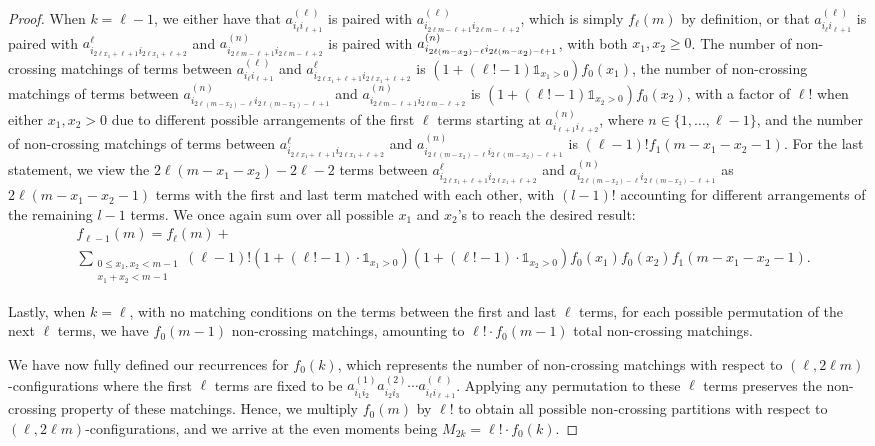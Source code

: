 \documentclass[11pt,reqno]{amsart}
\numberwithin{equation}{section}
\theoremstyle{plain}
\begin{document}
\begin{proof}
When $k=\ell-1$, we either have that $a^{(\ell)}_{i_{\ell}i_{\ell+1}}$ is paired with $a^{(\ell)}_{i_{2\ell m - \ell+1}i_{2\ell m - \ell+2}}$, which is simply $f_\ell(m)$ by definition, or that $a^{(\ell)}_{i_{\ell}i_{\ell+1}}$ is paired with $a^{\ell}_{i_{2\ell x_1 +\ell+1}i_{2\ell x_1+\ell+2}}$ and $a^{(n)}_{i_{2\ell m-\ell+1}i_{2\ell m-\ell+2}}$ is paired with $\\a^{(n)}_{i_{2\ell (m-x_2) - \ell}i_{2\ell(m- x_2) - \ell+1}}$, with both $x_1, x_2 \geq 0$. The number of non-crossing matchings of terms between $a^{(\ell)}_{i_{\ell}i_{\ell+1}}$ and $a^{\ell}_{i_{2\ell x_1 +\ell+1}i_{2\ell x_1+\ell+2}}$ is $(1+(\ell!-1)\mathbb{1}_{x_1>0})f_0(x_1)$, the number of non-crossing matchings of terms between $a^{(n)}_{i_{2\ell (m-x_2) - \ell}i_{2\ell(m- x_2) - \ell+1}}$ and $a^{(n)}_{i_{2\ell m-\ell+1}i_{2\ell m-\ell+2}}$ is  $(1+(\ell!-1)\mathbb{1}_{x_2>0})f_0(x_2)$, with a factor of $\ell!$ when either $x_1,x_2 > 0$ due to different possible arrangements of the first $\ell$ terms starting at $a^{(n)}_{i_{\ell+1}i_{\ell+2}}$, where $n \in \{1, \dotsc, \ell-1\}$, and the number of non-crossing matchings of terms between $a^{\ell}_{i_{2\ell x_1 +\ell+1}i_{2\ell x_1+\ell+2}}$ and $a^{(n)}_{i_{2\ell (m-x_2) - \ell}i_{2\ell(m- x_2) - \ell+1}}$ is $(\ell-1)!f_1(m-x_1-x_2-1)$. For the last statement, we view the $2\ell(m-x_1-x_2)-2\ell-2$ terms between $a^{\ell}_{i_{2\ell x_1 +\ell+1}i_{2\ell x_1+\ell+2}}$ and $a^{(n)}_{i_{2\ell (m-x_2) - \ell}i_{2\ell(m- x_2) - \ell+1}}$ as $2\ell(m-x_1-x_2-1)$ terms with the first and last term matched with each other, with $(l-1)!$ accounting for different arrangements of the remaining $l-1$ terms. We once again sum over all possible $x_1$ and $x_2$'s to reach the desired result:
\begin{align}
&f_{\ell-1}(m)=f_\ell(m)+\nonumber
\\
&\sum_{\substack{0\leq x_1,x_2<m-1\\ x_1+x_2<m-1}} (\ell-1)!(1+(\ell!-1)\cdot \mathbb{1}_{x_1>0})(1+(\ell!-1)\cdot \mathbb{1}_{x_2>0})f_0(x_1)f_0(x_2)f_1(m-x_1-x_2-1).
\end{align}

Lastly, when $k=\ell$, with no matching conditions on the terms between the first and last $\ell$ terms, for each possible permutation of the next $\ell$ terms, we have $f_0(m-1)$ non-crossing matchings, amounting to $\ell!\cdot f_0(m-1)$ total non-crossing matchings.

We have now fully defined our recurrences for $f_0(k)$, which represents the number of non-crossing matchings with respect to $(\ell, 2\ell m)$-configurations where the first $\ell$ terms are fixed to be $a^{(1)}_{i_1i_2}a^{(2)}_{i_2i_3}\cdots a^{(\ell)}_{i_\ell i_{\ell+1}}$. Applying any permutation to these $\ell$ terms preserves the non-crossing property of these matchings. Hence, we multiply $f_0(m)$ by $\ell!$ to obtain all possible non-crossing partitions with respect to $(\ell, 2\ell m)$-configurations, and we arrive at the even moments being $M_{2k}=\ell! \cdot f_0(k)$.


\end{proof}
\end{document}
